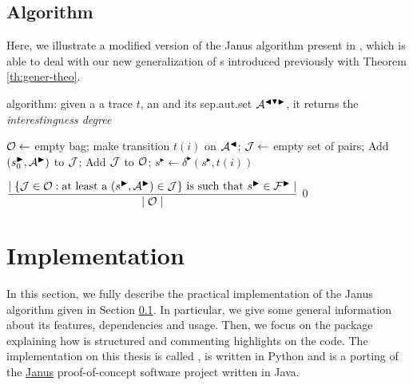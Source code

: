\subsection{Algorithm}\label{sec:janus-alg}
Here, we illustrate a modified version of the Janus algorithm present in \citep{cecconi2018interestingness}, which is able to deal with our new generalization of \rcon s introduced previously with Theorem \ref{th:gener-theo}.

\begin{algorithm}
	\caption{\janus algorithm: given a a trace $t$, an \rcon\xspace and its sep.aut.set $\mathcal{A}^{\blacktriangleleft \blacktriangledown \blacktriangleright}$, it returns the \textit{interestingness degree}}
	\label{alg:janus}
	\begin{algorithmic}[1]
		\State $\mathcal{O} \gets$ empty bag;
		\ForEach{$\automaton^\blacktriangleleft \in \automaton^{\blacktriangleleft \blacktriangledown \blacktriangleright}$} make transition $t(i)$ on $\mathcal{A}^\blacktriangleleft$;
		\EndFor
		 \label{alg:activation}
			\State $\mathcal{J} \gets$ empty set of pairs;
				\ForEach{$(\automaton^{\blacktriangleleft}, \automaton^{\blacktriangledown}, \automaton^{\blacktriangleright}) \in \automaton^{\blacktriangleleft \blacktriangledown \blacktriangleright}$}
						\State Add $(s_{0}^{\blacktriangleright}, \mathcal{A}^\blacktriangleright)$ to $\mathcal{J}$;
					\EndIf	
				\EndFor
				\State Add $\mathcal{J}$ to $\mathcal{O}$;
		\EndIf 		
		\ForEach{$\J \in \O$}
			 $s^{\blacktriangleright} \gets \delta^{\blacktriangleright}(s^{\blacktriangleright}, t(i)) $	
			\EndFor
		\EndFor
		\EndFor		

		\State \Return $\dfrac{\mid \{\mathcal{J} \in \mathcal{O}: \text{at least a } (s^{\blacktriangleright}, \mathcal{A}^\blacktriangleright) \in \mathcal{J} \} \text{ is such that } s^{\blacktriangleright} \in \mathcal{F}^{\blacktriangleright} \mid}{\mid \mathcal{O} \mid}$
		\Else
		\State \Return $0$
		\EndIf
		
	
	\end{algorithmic}
	
\end{algorithm}

\section{Implementation}\label{sec:janus-implementation}
In this section, we fully describe the practical implementation of the Janus algorithm given in Section \ref{sec:janus-alg}. In particular, we give some general information about its features, dependencies and usage. Then, we focus on the package explaining how is structured and commenting highlights on the code. The implementation on this thesis is called \janus, is written in Python and is a porting of the \href{https://github.com/Oneiroe/Janus}{Janus} proof-of-concept software project written in Java.

